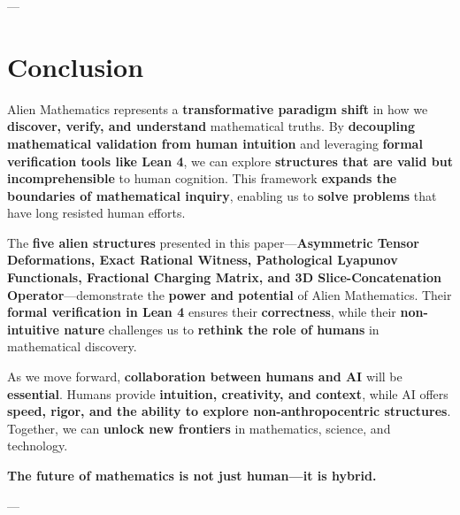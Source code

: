 \documentclass[11pt, a4paper]{article}
\begin{document}
---
\section{Conclusion}
Alien Mathematics represents a \textbf{transformative paradigm shift} in how we \textbf{discover, verify, and understand} mathematical truths. By \textbf{decoupling mathematical validation from human intuition} and leveraging \textbf{formal verification tools like Lean 4}, we can explore \textbf{structures that are valid but incomprehensible} to human cognition. This framework \textbf{expands the boundaries of mathematical inquiry}, enabling us to \textbf{solve problems} that have long resisted human efforts.

The \textbf{five alien structures} presented in this paper—\textbf{Asymmetric Tensor Deformations, Exact Rational Witness, Pathological Lyapunov Functionals, Fractional Charging Matrix, and 3D Slice-Concatenation Operator}—demonstrate the \textbf{power and potential} of Alien Mathematics. Their \textbf{formal verification in Lean 4} ensures their \textbf{correctness}, while their \textbf{non-intuitive nature} challenges us to \textbf{rethink the role of humans} in mathematical discovery.

As we move forward, \textbf{collaboration between humans and AI} will be \textbf{essential}. Humans provide \textbf{intuition, creativity, and context}, while AI offers \textbf{speed, rigor, and the ability to explore non-anthropocentric structures}. Together, we can \textbf{unlock new frontiers} in mathematics, science, and technology.

\textbf{The future of mathematics is not just human—it is hybrid.}

---



\newpage
\end{document}
